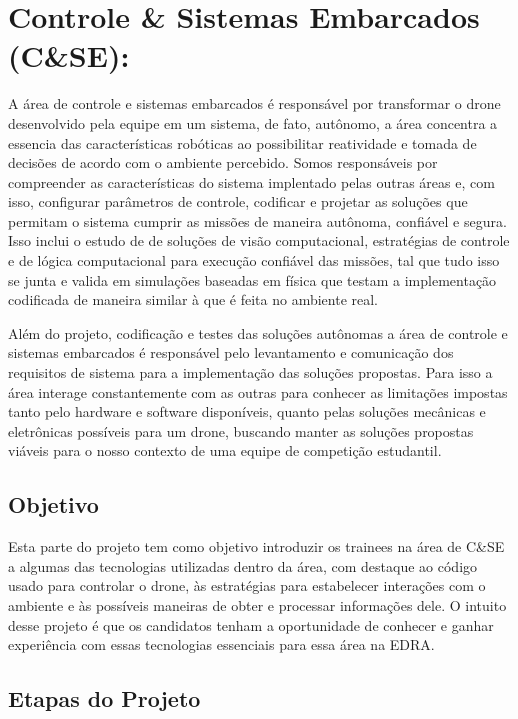 \section{Controle \& Sistemas Embarcados (C\&SE):}

A área de controle e sistemas embarcados é responsável por transformar o drone desenvolvido pela equipe em um sistema, de fato, autônomo, a área concentra a essencia das características robóticas ao possibilitar reatividade e tomada de decisões de acordo com o ambiente percebido. Somos responsáveis por compreender as características do sistema implentado pelas outras áreas e, com isso, configurar parâmetros de controle, codificar e projetar as soluções que permitam o sistema cumprir as missões de maneira autônoma, confiável e segura. Isso inclui o estudo de de soluções de visão computacional, estratégias de controle e de lógica computacional para execução confiável das missões, tal que tudo isso se junta e valida em simulações baseadas em física que testam a implementação codificada de maneira similar à que é feita no ambiente real.

Além do projeto, codificação e testes das soluções autônomas a área de controle e sistemas embarcados é responsável pelo levantamento e comunicação dos requisitos de sistema para a implementação das soluções propostas. Para isso a área interage constantemente com as outras para conhecer as limitações impostas tanto pelo hardware e software disponíveis, quanto pelas soluções mecânicas e eletrônicas possíveis para um drone, buscando manter as soluções propostas viáveis para o nosso contexto de uma equipe de competição estudantil.

\subsection*{Objetivo}

Esta parte do projeto tem como objetivo introduzir os trainees na área de C\&SE a algumas das tecnologias utilizadas dentro da área, com destaque ao código usado para controlar o drone, às estratégias para estabelecer interações com o ambiente e às possíveis maneiras de obter e processar informações dele. O intuito desse projeto é que os candidatos tenham a oportunidade de conhecer e ganhar experiência com essas tecnologias essenciais para essa área na EDRA.

\subsection*{Etapas do Projeto}

